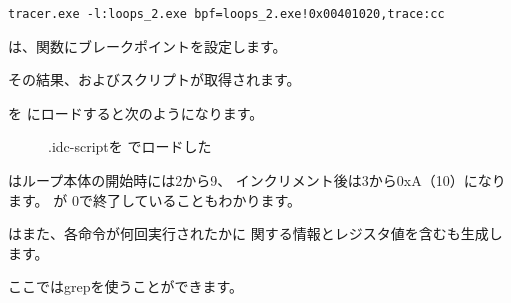 \begin{lstlisting}
tracer.exe -l:loops_2.exe bpf=loops_2.exe!0x00401020,trace:cc
\end{lstlisting}

は、関数にブレークポイントを設定します。

その結果、およびスクリプトが取得されます。

\clearpage
{}を \IDA にロードすると次のようになります。

\begin{figure}[H]
\centering
{}
\caption{.idc-scriptを \IDA でロードした}
\label{fig:loops_IDA_tracer}
\end{figure}

\ESI はループ本体の開始時には2から9、
インクリメント後は3から0xA（10）になります。
\main が \EAX 0で終了していることもわかります。

\tracer はまた、各命令が何回実行されたかに
関する情報とレジスタ値を含むも生成します。


\myindex{\GrepUsage}
ここではgrepを使うことができます。
